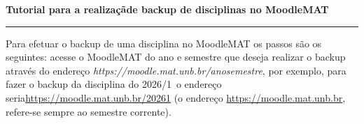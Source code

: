 \documentclass[12pt]{report}
\def\ano{2026}
\def\semestre{1}
\begin{document}
\begin{center}
    {\Large \textbf{Tutorial para a realizaçãde backup de disciplinas no MoodleMAT}}
\end{center}
\vspace{.3cm}
\hrule

\vspace{.7cm}

Para efetuar o backup de uma disciplina no MoodleMAT os passos são os seguintes: acesse o MoodleMAT do ano e semestre que deseja realizar
o backup através do endereço \textit{https://moodle.mat.unb.br/anosemestre}, por exemplo, para fazer o backup da disciplina do
\ano/\semestre\ o endereço seria\linebreak \href{https://moodle.mat.unb.br/\ano\semestre}{https://moodle.mat.unb.br/\ano\semestre} (o endereço \href{https://moodle.mat.unb.br}{https://moodle.mat.unb.br}, refere-se sempre ao semestre corrente).
\end{document}
